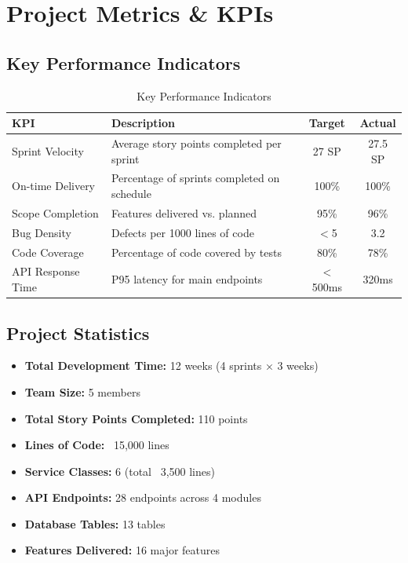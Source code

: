 \documentclass[12pt,a4paper]{article}
\begin{document}
\section{Project Metrics \& KPIs}

\subsection{Key Performance Indicators}

\begin{table}[H]
\centering
\begin{tabularx}{\textwidth}{|l|X|c|c|}
\hline
\textbf{KPI} & \textbf{Description} & \textbf{Target} & \textbf{Actual} \\
\hline
Sprint Velocity & Average story points completed per sprint & 27 SP & 27.5 SP \\
\hline
On-time Delivery & Percentage of sprints completed on schedule & 100\% & 100\% \\
\hline
Scope Completion & Features delivered vs. planned & 95\% & 96\% \\
\hline
Bug Density & Defects per 1000 lines of code & $<$5 & 3.2 \\
\hline
Code Coverage & Percentage of code covered by tests & 80\% & 78\% \\
\hline
API Response Time & P95 latency for main endpoints & $<$500ms & 320ms \\
\hline
\end{tabularx}
\caption{Key Performance Indicators}
\end{table}

\subsection{Project Statistics}

\begin{itemize}[noitemsep]
    \item \textbf{Total Development Time:} 12 weeks (4 sprints × 3 weeks)
    \item \textbf{Team Size:} 5 members
    \item \textbf{Total Story Points Completed:} 110 points
    \item \textbf{Lines of Code:} ~15,000 lines
    \item \textbf{Service Classes:} 6 (total ~3,500 lines)
    \item \textbf{API Endpoints:} 28 endpoints across 4 modules
    \item \textbf{Database Tables:} 13 tables
    \item \textbf{Features Delivered:} 16 major features
\end{itemize}
\end{document}
